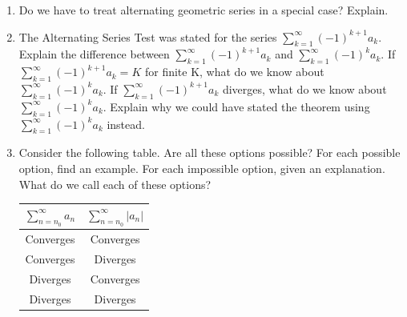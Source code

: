 \begin{enumerate}
\item Do we have to treat alternating geometric series in a special case?  Explain.

\item The Alternating Series Test was stated for the series $
\displaystyle\sum\limits_{k = 1}^\infty  {\left( { - 1} \right)^{k + 1} a_k } $.  Explain the difference between $\displaystyle\sum\limits_{k = 1}^\infty  {\left( { - 1} \right)^{k + 1} a_k } $  and $\displaystyle\sum\limits_{k = 1}^\infty  {\left( { - 1} \right)^k a_k } $.  If  $
\displaystyle\sum\limits_{k = 1}^\infty  {\left( { - 1} \right)^{k + 1} a_k }  = K$
  for finite K, what do we know about $
\displaystyle\sum\limits_{k = 1}^\infty  {\left( { - 1} \right)^k a_k } $.  If  $
\displaystyle\sum\limits_{k = 1}^\infty  {\left( { - 1} \right)^{k + 1} a_k } 
$  diverges, what do we know about $\displaystyle\sum\limits_{k = 1}^\infty  {\left( { - 1} \right)^k a_k } $.  Explain why we could have stated the theorem using $\displaystyle\sum\limits_{k = 1}^\infty  {\left( { - 1} \right)^k a_k } $ instead.  \cite{SM}

\item Consider the following table.  Are all these options possible?  For each possible option, find an example.  For each impossible option, given an explanation.  What do we call each of these options?


\begin{center}
\begin{tabular}{|c|c|} \hline
$\displaystyle\sum\limits_{n = n_0 }^\infty  {a_n } $ & $ \displaystyle\sum\limits_{n = n_0 }^\infty  {\left| {a_n } \right|} $ \\   \hline
Converges & Converges \\ \hline
Converges & Diverges \\ \hline
Diverges & Converges \\ \hline
Diverges & Diverges \\ \hline
\end{tabular}
\end{center}



\end{enumerate}
